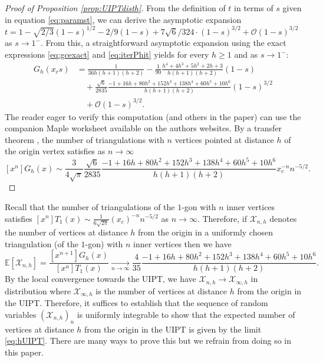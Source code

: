 \documentclass[AHL,XML,longabstracts,Unicode,NoSaveZebib]{cedram}
\begin{document}
\begin{proof}[Proof of Proposition \ref{prop:UIPTdisth}]
{From the definition of $t$ in terms of $s$ given in equation \eqref{eq:paramst}, we can derive the asymptotic expansion $t = 1 - \sqrt{2/3} (1-s)^{1/2}  - 2/9 (1-s) +7\sqrt{6}/324 \cdot (1-s)^{3/2} + \mathcal O (1-s)^{3/2}$ as $s \to 1^-$. From this, a straightforward asymptotic expansion} using the exact expressions \eqref{eq:gcexact} and \eqref{eq:iterPhit} yields for every $h \geq 1$ and as $s\to1^-$:
\begin{align*}
G_h(x_c s) &=
\frac{1}{36 h (h+1) (h+2)}
- \frac{1}{90} \frac{h^4+4h^3+5h^2+2h+3}{h(h+1)(h+2)} \left(1-s\right)\\
& \quad + \frac{\sqrt{6}}{2835} \frac{-1+16h+80h^2+152h^3+138h^4+60h^5+10h^6}{h(h+1)(h+2)} \left( 1-s \right)^{3/2}\\
& \quad + \mathcal{O} \left( 1-s \right)^{3/2}.
\end{align*}
The reader eager to verify this computation (and others in the paper) can use the companion Maple worksheet available on the authors websites.
By a transfer theorem \cite[Theorem VI.4 p. 393]{FS}, the number of triangulations with $n$ vertices pointed at distance $h$ of the origin vertex satisfies as $n \to \infty $
\[
\left[ x^{n} \right] G_h(x) \sim \frac{3}{4 \sqrt \pi} \frac{\sqrt{6}}{2835} \frac{-1+16h+80h^2+152h^3+138h^4+60h^5+10h^6}{h(h+1)(h+2)}
x_c^{-n} n^{-5/2}.
\]
\end{proof}

\begin{remark}
Recall that the number of triangulations of the $1$-gon with $n$ inner vertices satisfies $[ x^{n} ] T_1(x) \sim \frac{1}{6 \sqrt{2 \pi}} (x_c)^{-n} n^{-5/2}$ as $n \to \infty$. Therefore, if $ \mathcal{X}_{n,h}$ denotes the number of vertices at distance $h$ from the origin in a uniformly chosen triangulation (of the $1$-gon) with $n$ inner vertices then we have
\begin{equation}
\label{eq:hUIPT}
\mathbb{E}[ \mathcal{X}_{n,h}] = \frac{\left[ x^{n+1} \right] G_h(x)}{\left[ x^{n} \right] T_1(x)} \xrightarrow[n\to\infty]{} \frac{4}{35} \frac{-1+16h+80h^2+152h^3+138h^4+60h^5+10h^6}{h(h+1)(h+2)}.
\end{equation}
By the local convergence towards the UIPT, we have $ \mathcal{X}_{n,h} \to \mathcal{X}_{\infty,h}$ in distribution where $\mathcal{X}_{\infty,h}$ is the number of vertices at distance $h$ from the origin in the UIPT. Therefore, it suffices to establish that the sequence of random variables $(\mathcal{X}_{n,h})_n$ is uniformly integrable to show that the expected number of vertices at distance $h$ from the origin in the UIPT is given by the limit \eqref{eq:hUIPT}. There are many ways to prove this but we refrain from doing so in this paper.
\end{remark}
\end{document}
